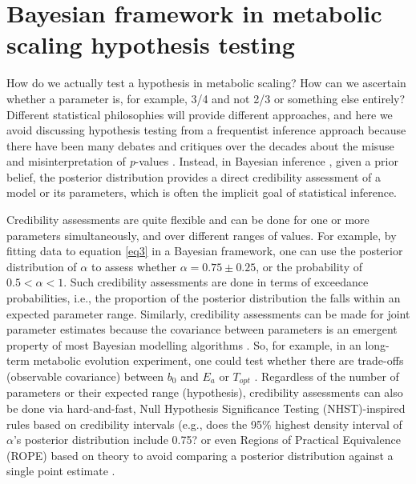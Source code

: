 \documentclass[a4paper,12pt]{article}
\begin{document}
\bigskip
\bigskip

\section{Bayesian framework in metabolic scaling hypothesis testing}
\label{bayesian}

How do we actually test a hypothesis in metabolic scaling? How can we ascertain whether a parameter is, for example, 3/4 and not 2/3 or something else entirely? Different statistical philosophies will provide different approaches, and here we avoid discussing hypothesis testing from a frequentist inference approach because there have been many debates and critiques over the decades about the misuse and misinterpretation of \emph{p}-values \citep[for recent discussions please see][]{wasserstein2016amstat, benjamin2017nathumbeh, amrhein2019nat, muff2022tree, lakens2022tree, muff2022responsetree}. Instead, in Bayesian inference \citep{kruschke2010tree}, given a prior belief, the posterior distribution provides a direct credibility assessment of a model or its parameters, which is often the implicit goal of statistical inference.

Credibility assessments are quite flexible and can be done for one or more parameters simultaneously, and over different ranges of values. For example, by fitting data to equation \ref{eq3} in a Bayesian framework, one can use the posterior distribution of $\alpha$ to assess whether $\alpha = 0.75 \pm 0.25$, or the probability of $0.5 < \alpha < 1$. Such credibility assessments are done in terms of exceedance probabilities, i.e., the proportion of the posterior distribution the falls within an expected parameter range. Similarly, credibility assessments can be made for joint parameter estimates because the covariance between parameters is an emergent property of most Bayesian modelling algorithms \citep{kruschke2010tree}. So, for example, in an long-term metabolic evolution experiment, one could test whether there are trade-offs (observable covariance) between $b_0$ and $E_a$ or $T_{opt}$ \citep[i.e., the temperature at which metabolic rate is at its maximum;][]{schoolfield1981, pawar2016amnat, barton2020ele}. Regardless of the number of parameters or their expected range (hypothesis), credibility assessments can also be done via hard-and-fast, Null Hypothesis Significance Testing (NHST)-inspired rules based on credibility intervals (e.g., does the 95\% highest density interval of $\alpha$'s posterior distribution include 0.75? \citep{barneche2014ele, barneche2018ele} or even Regions of Practical Equivalence (ROPE) based on theory \citep{kruscke2018psybullrev, nunes2021functecol} to avoid comparing a posterior distribution against a single point estimate \cite[however, please note that the ROPE concept has been recently called into question;][]{schwaferts2020report}.
\end{document}
